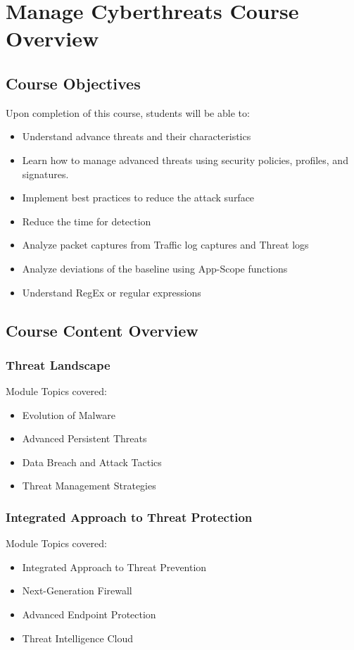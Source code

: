 \section{Manage Cyberthreats Course Overview}
\subsection{Course Objectives}
Upon completion of this course, students will be able to:
\begin{itemize}
    \item Understand advance threats and their characteristics
    \item Learn how to manage advanced threats using security policies, profiles, and signatures.
    \item Implement best practices to reduce the attack surface
    \item Reduce the time for detection
    \item Analyze packet captures from Traffic log captures and Threat logs
    \item Analyze deviations of the baseline using App-Scope functions
    \item Understand RegEx or regular expressions
\end{itemize}

\subsection{Course Content Overview}
\subsubsection{Threat Landscape}

Module Topics covered:
\begin{itemize}
    \item Evolution of Malware
    \item Advanced Persistent Threats
    \item Data Breach and Attack Tactics
    \item Threat Management Strategies
\end{itemize}

\subsubsection{Integrated Approach to Threat Protection}

Module Topics covered:
\begin{itemize}
    \item Integrated Approach to Threat Prevention
    \item Next-Generation Firewall
    \item Advanced Endpoint Protection
    \item Threat Intelligence Cloud
\end{itemize}

